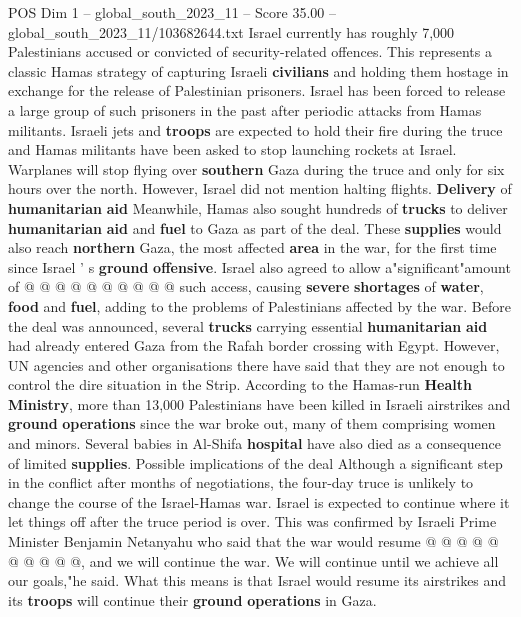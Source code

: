 \begin{textsample}{POS Dim 1 – global\_south\_2023\_11 – Score 35.00 – global\_south\_2023\_11/103682644.txt}
Israel currently has roughly 7,000 Palestinians accused or convicted of security-related offences.
This represents a classic Hamas strategy of capturing Israeli \textbf{civilians} and holding them hostage in exchange for the release of Palestinian prisoners.
Israel has been forced to release a large group of such prisoners in the past after periodic attacks from Hamas militants.
Israeli jets and \textbf{troops} are expected to hold their fire during the truce and Hamas militants have been asked to stop launching rockets at Israel.
Warplanes will stop flying over \textbf{southern} Gaza during the truce and only for six hours over the north.
However, Israel did not mention halting flights. \textbf{Delivery} of \textbf{humanitarian} \textbf{aid} Meanwhile, Hamas also sought hundreds of \textbf{trucks} to deliver \textbf{humanitarian} \textbf{aid} and \textbf{fuel} to Gaza as part of the deal.
These \textbf{supplies} would also reach \textbf{northern} Gaza, the most affected \textbf{area} in the war, for the first time since Israel ' s \textbf{ground} \textbf{offensive}.
Israel also agreed to allow a"significant"amount of @ @ @ @ @ @ @ @ @ @ such access, causing \textbf{severe} \textbf{shortages} of \textbf{water}, \textbf{food} and \textbf{fuel}, adding to the problems of Palestinians affected by the war.
Before the deal was announced, several \textbf{trucks} carrying essential \textbf{humanitarian} \textbf{aid} had already entered Gaza from the Rafah border crossing with Egypt.
However, UN agencies and other organisations there have said that they are not enough to control the dire situation in the Strip.
According to the Hamas-run \textbf{Health} \textbf{Ministry}, more than 13,000 Palestinians have been killed in Israeli airstrikes and \textbf{ground} \textbf{operations} since the war broke out, many of them comprising women and minors.
Several babies in Al-Shifa \textbf{hospital} have also died as a consequence of limited \textbf{supplies}.
Possible implications of the deal Although a significant step in the conflict after months of negotiations, the four-day truce is unlikely to change the course of the Israel-Hamas war.
Israel is expected to continue where it let things off after the truce period is over.
This was confirmed by Israeli Prime Minister Benjamin Netanyahu who said that the war would resume @ @ @ @ @ @ @ @ @ @, and we will continue the war.
We will continue until we achieve all our goals,"he said.
What this means is that Israel would resume its airstrikes and its \textbf{troops} will continue their \textbf{ground} \textbf{operations} in Gaza.

\end{textsample}
